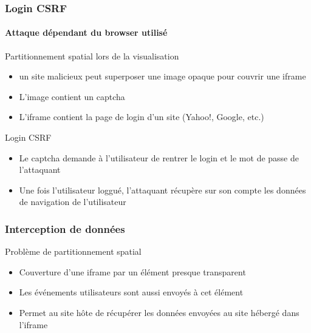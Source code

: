 \begin{reveals}
\begin{frame}
\end{frame}


\begin{frame}
  \frametitle{Login CSRF}
  \framesubtitle{Attaque d{\'e}pendant du browser utilis{\'e}}

  \begin{block}{Partitionnement spatial lors de la visualisation}
    \begin{itemize}
    \item un site malicieux peut superposer une image opaque pour
      couvrir une iframe
    \item L'image contient un captcha
    \item L'iframe contient la page de login d'un site (Yahoo!,
      Google, etc.)
    \end{itemize}
  \end{block}

  \pause

  \begin{block}{Login CSRF}
    \begin{itemize}
    \item Le captcha demande {\`a} l'utilisateur de rentrer le login et le
      mot de passe de l'attaquant
    \item Une fois l'utilisateur loggu{\'e}, l'attaquant r{\'e}cup{\`e}re sur son
      compte les donn{\'e}es de navigation de l'utilisateur
    \end{itemize}
  \end{block}

\end{frame}

\begin{frame}
  \frametitle{Interception de donn{\'e}es}

  \begin{block}{Probl{\`e}me de partitionnement spatial}
    \begin{itemize}
    \item Couverture d'une iframe par un {\'e}l{\'e}ment presque transparent
    \item Les {\'e}v{\'e}nements utilisateurs sont aussi envoy{\'e}s {\`a} cet {\'e}l{\'e}ment
    \item Permet au site h{\^o}te de r{\'e}cup{\'e}rer les donn{\'e}es envoy{\'e}es au
      site h{\'e}berg{\'e} dans l'iframe
    \end{itemize}
  \end{block}

  \pause


\end{frame}
\end{reveals}
